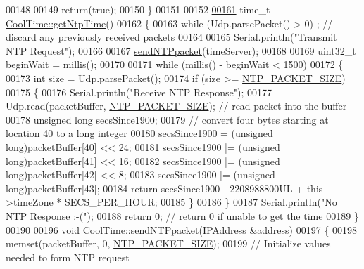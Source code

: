\begin{DoxyCode}
00148 
00149     \textcolor{keywordflow}{return}(\textcolor{keyword}{true});
00150 \}
00151 
00152 
\hyperlink{class_cool_time_a41fbbbfd651c2079f54d4b2911e4c705}{00161} time\_t \hyperlink{class_cool_time_a41fbbbfd651c2079f54d4b2911e4c705}{CoolTime::getNtpTime}()
00162 \{
00163     \textcolor{keywordflow}{while} (Udp.parsePacket() > 0) ; \textcolor{comment}{// discard any previously received packets}
00164     
00165     Serial.println(\textcolor{stringliteral}{"Transmit NTP Request"});
00166 
00167     \hyperlink{class_cool_time_a236a38d120dc53bc67456d763838c5a1}{sendNTPpacket}(timeServer);
00168 
00169     uint32\_t beginWait = millis();
00170 
00171     \textcolor{keywordflow}{while} (millis() - beginWait < 1500) 
00172     \{
00173         \textcolor{keywordtype}{int} size = Udp.parsePacket();
00174         \textcolor{keywordflow}{if} (size >= \hyperlink{_cool_time_8h_a56a6ea64006651b4f42adf713e244f06}{NTP\_PACKET\_SIZE}) 
00175         \{
00176             Serial.println(\textcolor{stringliteral}{"Receive NTP Response"});
00177             Udp.read(packetBuffer, \hyperlink{_cool_time_8h_a56a6ea64006651b4f42adf713e244f06}{NTP\_PACKET\_SIZE});  \textcolor{comment}{// read packet into the buffer}
00178             \textcolor{keywordtype}{unsigned} \textcolor{keywordtype}{long} secsSince1900;
00179             \textcolor{comment}{// convert four bytes starting at location 40 to a long integer}
00180             secsSince1900 =  (\textcolor{keywordtype}{unsigned} long)packetBuffer[40] << 24;
00181             secsSince1900 |= (\textcolor{keywordtype}{unsigned} long)packetBuffer[41] << 16;
00182             secsSince1900 |= (\textcolor{keywordtype}{unsigned} long)packetBuffer[42] << 8;
00183             secsSince1900 |= (\textcolor{keywordtype}{unsigned} long)packetBuffer[43];
00184             \textcolor{keywordflow}{return} secsSince1900 - 2208988800UL + this->timeZone * SECS\_PER\_HOUR;
00185         \}
00186     \}
00187     Serial.println(\textcolor{stringliteral}{"No NTP Response :-("});
00188     \textcolor{keywordflow}{return} 0; \textcolor{comment}{// return 0 if unable to get the time}
00189 \}
00190 
\hyperlink{class_cool_time_a236a38d120dc53bc67456d763838c5a1}{00196} \textcolor{keywordtype}{void} \hyperlink{class_cool_time_a236a38d120dc53bc67456d763838c5a1}{CoolTime::sendNTPpacket}(IPAddress &address)
00197 \{
00198     memset(packetBuffer, 0, \hyperlink{_cool_time_8h_a56a6ea64006651b4f42adf713e244f06}{NTP\_PACKET\_SIZE});
00199     \textcolor{comment}{// Initialize values needed to form NTP request}

\end{DoxyCode}
